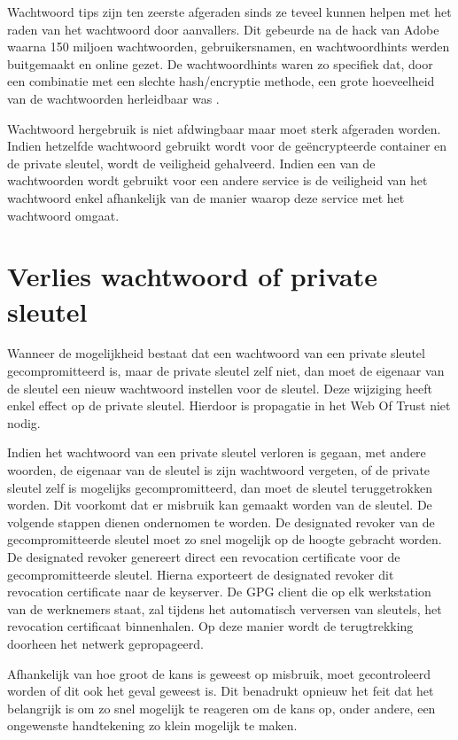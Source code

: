 Wachtwoord tips zijn ten zeerste afgeraden sinds ze teveel kunnen helpen met het
raden van het wachtwoord door aanvallers. Dit gebeurde na de hack van Adobe
waarna 150 miljoen wachtwoorden, gebruikersnamen, en wachtwoordhints werden
buitgemaakt en online gezet. De wachtwoordhints waren zo specifiek dat, door een
combinatie met een slechte \gls{hash}/encryptie methode, een grote hoeveelheid
van de
wachtwoorden herleidbaar was \autocite{HernGuardianAdobeLeak}.

Wachtwoord hergebruik is niet afdwingbaar maar moet sterk afgeraden worden.
Indien hetzelfde wachtwoord gebruikt wordt voor de geëncrypteerde container en
de private sleutel, wordt de veiligheid gehalveerd. Indien een van de
wachtwoorden wordt gebruikt voor een andere service is de veiligheid van het
wachtwoord enkel afhankelijk van de manier waarop deze service met het
wachtwoord omgaat.

\section{Verlies wachtwoord of private sleutel}
\label{sec:verlies-wachtwoord-of-private-sleutel}
Wanneer de mogelijkheid bestaat dat een wachtwoord van een private sleutel
gecompromitteerd is, maar de private sleutel zelf niet, dan moet de eigenaar van
de sleutel een nieuw wachtwoord instellen voor de sleutel. Deze wijziging heeft
enkel effect op de private sleutel. Hierdoor is propagatie in het Web Of Trust
niet nodig.

Indien het wachtwoord van een private sleutel verloren is gegaan, met andere
woorden, de eigenaar van de sleutel is zijn wachtwoord vergeten, of de private
sleutel zelf is mogelijks gecompromitteerd, dan moet de sleutel teruggetrokken
worden. Dit voorkomt dat er misbruik kan gemaakt worden van de sleutel. De
volgende stappen dienen ondernomen te worden. De designated revoker van de
gecompromitteerde sleutel moet zo snel mogelijk op de hoogte gebracht worden. De
designated revoker genereert direct een revocation certificate voor de
gecompromitteerde sleutel. Hierna exporteert de designated revoker dit
revocation certificate naar de keyserver. De \gls{GPG} client die op elk
werkstation
van de werknemers staat, zal tijdens het automatisch verversen van sleutels, het
revocation certificaat binnenhalen. Op deze manier wordt de terugtrekking
doorheen het netwerk gepropageerd.

Afhankelijk van hoe groot de kans is geweest op misbruik, moet gecontroleerd
worden of dit ook het geval geweest is. Dit benadrukt opnieuw het feit dat het
belangrijk is om zo snel mogelijk te reageren om de kans op, onder andere, een
ongewenste handtekening zo klein mogelijk te maken.

